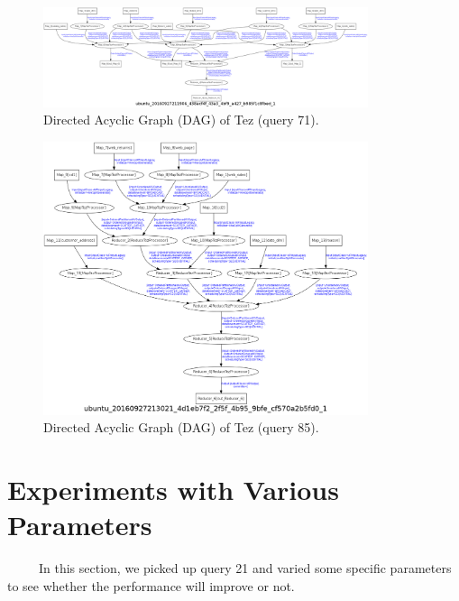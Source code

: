 \documentclass[10pt]{article}
\begin{document}
\begin{figure}
\begin{center}
\includegraphics[width=0.85\textwidth]{pic/dag_tez_query71}
\caption{Directed Acyclic Graph (DAG) of Tez (query 71).}
\label{fig:q1d_tez_71}
\end{center}
\end{figure}

\begin{figure}
\begin{center}
\includegraphics[width=0.85\textwidth]{pic/dag_tez_query85}
\caption{Directed Acyclic Graph (DAG) of Tez (query 85).}
\label{fig:q1d_tez_85}
\end{center}
\end{figure}




\section{Experiments with Various Parameters}

~~~~~In this section, we picked up query 21 and varied some specific parameters to see whether the performance will improve or not.
\end{document}
